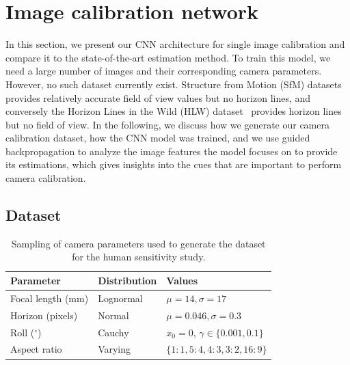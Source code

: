 \section{Image calibration network}
\label{sec:ch4_proposed_method}

In this section, we present our CNN architecture for single image calibration  and compare it to the state-of-the-art estimation method.  To train this model, we need a large number of images and their corresponding camera parameters. However, no such dataset currently exist. Structure from Motion (SfM) datasets~\cite{Wilson2014} provides relatively accurate field of view values but no horizon lines, and conversely the Horizon Lines in the Wild (HLW) dataset~\cite{Workman2016} provides horizon lines but no field of view. In the following, we discuss how we generate our camera calibration dataset, how the CNN model was trained, and we use guided backpropagation to analyze the image features the model focuses on to provide its estimations, which gives insights into the cues that are important to perform camera calibration.

\subsection{Dataset}
\label{sec:dataset_generation}

\begin{table}[!t]
\centering
\footnotesize
\begin{tabular}{lll}
\toprule
Parameter & Distribution & Values \\
\midrule
Focal length (mm) & Lognormal & $\mu=14, \sigma=17$ \\
Horizon (pixels) & Normal & $\mu=0.046, \sigma=0.3$ \\
Roll ($^\circ$) & Cauchy & $x_0 = 0$, $\gamma \in \{0.001, 0.1\}$ \\
Aspect ratio & Varying & $\{1{:}1, 5{:}4, 4{:}3, 3{:}2, 16{:}9\}$ \\
\bottomrule
\end{tabular}
\vspace{1em}
\caption{Sampling of camera parameters used to generate the dataset for the human sensitivity study.}
\label{tab:parameters-sampling}
\end{table}

